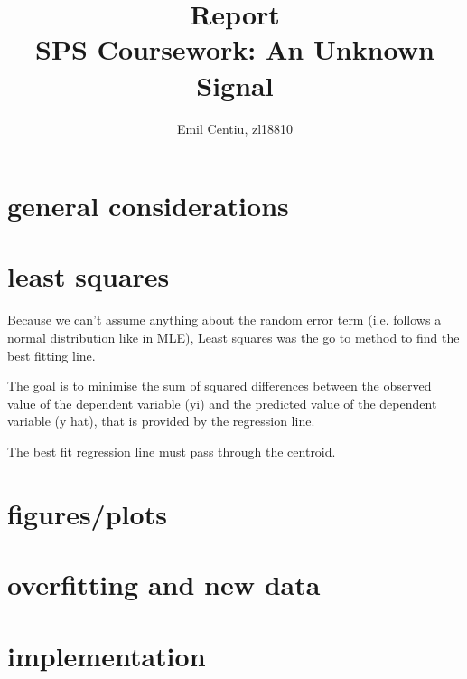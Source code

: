 \documentclass[notitlepage]{report}
\author{Emil Centiu, zl18810}
\title{Report \\
		\large{SPS Coursework: An Unknown Signal} \\
	}
\begin{document}
		\maketitle
		
		\section*{general considerations}
		
		\section*{least squares}
		Because we can't assume anything about the random error term (i.e. follows a normal distribution like in MLE), Least squares was the go to method to find the best fitting line. 
		
		The goal is to minimise the sum of squared differences between the observed value of the dependent variable (yi) and the predicted value of the dependent variable (y hat), that is provided by the regression line.
		
		The best fit regression line must pass through the centroid.
		\section*{figures/plots}
		
		\section*{overfitting and new data}
				
		\section*{implementation}
		
	
\end{document}
